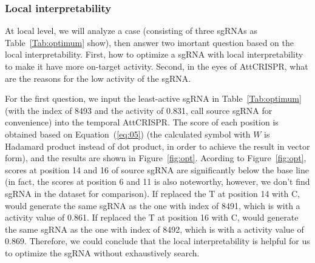 \documentclass{bioinfo}
\begin{document}
\subsubsection{Local interpretability}\label{section:local}

At local level, we will analyze a case (consisting of three sgRNAs as Table~\ref{Tab:optimum} show), then answer two imortant question based on the local interpretability. 
First, how to optimize a sgRNA with local interpretability to make it have more on-target activity. 
Second, in the eyes of AttCRISPR, what are the reasons for the low activity of the sgRNA. 

For the first question, we input the least-active sgRNA in Table~\ref{Tab:optimum} (with the index of 8493 and the activity of 0.831, call source sgRNA for convenience) into the temporal AttCRISPR. 
The score of each position is obtained based on Equation~(\ref{eq:05}) (the calculated symbol with $W$ is Hadamard product instead of dot product, in order to achieve the result in vector form), 
and the results are shown in Figure~\ref{fig:opt}. 
Acording to Figure~\ref{fig:opt}, scores at position 14 and 16 of source sgRNA are significantly below the base line 
(in fact, the scores at position 6 and 11 is also noteworthy, however, we don't find sgRNA in the dataset for comparison). 
If replaced the T at position 14 with C, would generate the same sgRNA as the one with index of 8491, which is with a activity value of 0.861. 
If replaced the T at position 16 with C, would generate the same sgRNA as the one with index of 8492, which is with a activity value of 0.869. 
Therefore, we could conclude that the local interpretability is helpful for us to optimize the sgRNA without exhaustively search.
\end{document}
